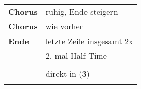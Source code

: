 \begin{tabular}{p{1.6cm}l}
	\textbf{Chorus} & ruhig, Ende steigern                                \\
	\textbf{Chorus} & wie vorher                                          \\
	\textbf{Ende}   & letzte Zeile insgesamt 2x                           \\
	                & 2. mal Half Time                                    \\
	                &                                                     \\
	                & direkt in (3)                                       \\
	                &                                                     \\
\end{tabular}
